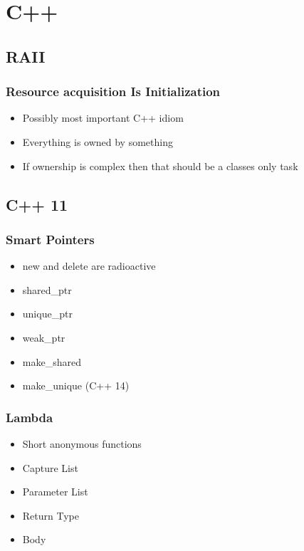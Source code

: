\documentclass[usepdftitle=false,professionalfonts,compress ]{beamer}
\begin{document}
\section{C++}
		
\subsection{RAII}

{
\begin{frame}\frametitle{Resource acquisition Is Initialization}

	\begin{itemize}
	\item Possibly most important C++ idiom
			\item Everything is owned by something
			\item If ownership is complex then that should be a classes only task
				\end{itemize}

\end{frame}}





\subsection{C++ 11}

{
\begin{frame}\frametitle{Smart Pointers}

	\begin{itemize}
	\item new and delete are radioactive
			\item shared\_ptr
			\item unique\_ptr
			\item weak\_ptr
			\item make\_shared
			\item make\_unique (C++ 14)
				\end{itemize}

\end{frame}}








{
\begin{frame}\frametitle{Lambda}

	\begin{itemize}
	\item Short anonymous functions
			\item Capture List
			\item Parameter List
			\item Return Type
			\item Body
				\end{itemize}

\end{frame}}
\end{document}
